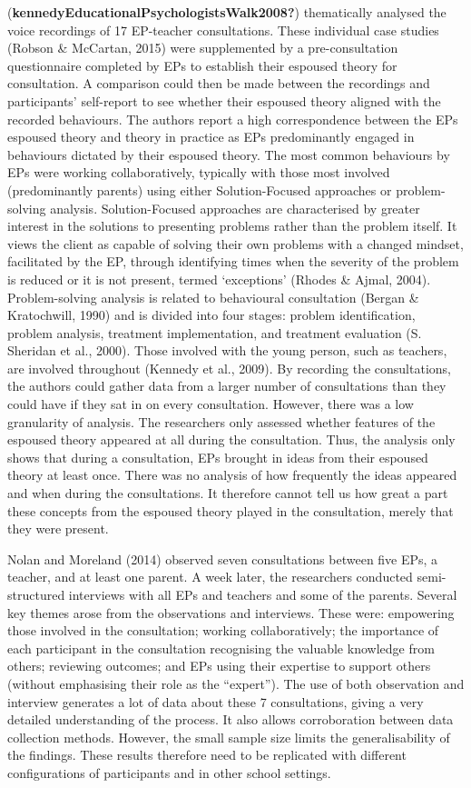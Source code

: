 \documentclass[
  english,
  man]{apa}
\begin{document}
(\textbf{kennedyEducationalPsychologistsWalk2008?}) thematically analysed the voice recordings of 17 EP-teacher consultations. These individual case studies (Robson \& McCartan, 2015) were supplemented by a pre-consultation questionnaire completed by EPs to establish their espoused theory for consultation. A comparison could then be made between the recordings and participants' self-report to see whether their espoused theory aligned with the recorded behaviours. The authors report a high correspondence between the EPs espoused theory and theory in practice as EPs predominantly engaged in behaviours dictated by their espoused theory. The most common behaviours by EPs were working collaboratively, typically with those most involved (predominantly parents) using either Solution-Focused approaches or problem-solving analysis. Solution-Focused approaches are characterised by greater interest in the solutions to presenting problems rather than the problem itself. It views the client as capable of solving their own problems with a changed mindset, facilitated by the EP, through identifying times when the severity of the problem is reduced or it is not present, termed `exceptions' (Rhodes \& Ajmal, 2004). Problem-solving analysis is related to behavioural consultation (Bergan \& Kratochwill, 1990) and is divided into four stages: problem identification, problem analysis, treatment implementation, and treatment evaluation (S. Sheridan et al., 2000). Those involved with the young person, such as teachers, are involved throughout (Kennedy et al., 2009). By recording the consultations, the authors could gather data from a larger number of consultations than they could have if they sat in on every consultation. However, there was a low granularity of analysis. The researchers only assessed whether features of the espoused theory appeared at all during the consultation. Thus, the analysis only shows that during a consultation, EPs brought in ideas from their espoused theory at least once. There was no analysis of how frequently the ideas appeared and when during the consultations. It therefore cannot tell us how great a part these concepts from the espoused theory played in the consultation, merely that they were present.

Nolan and Moreland (2014) observed seven consultations between five EPs, a teacher, and at least one parent. A week later, the researchers conducted semi-structured interviews with all EPs and teachers and some of the parents. Several key themes arose from the observations and interviews. These were: empowering those involved in the consultation; working collaboratively; the importance of each participant in the consultation recognising the valuable knowledge from others; reviewing outcomes; and EPs using their expertise to support others (without emphasising their role as the ``expert''). The use of both observation and interview generates a lot of data about these 7 consultations, giving a very detailed understanding of the process. It also allows corroboration between data collection methods. However, the small sample size limits the generalisability of the findings. These results therefore need to be replicated with different configurations of participants and in other school settings.
\end{document}
